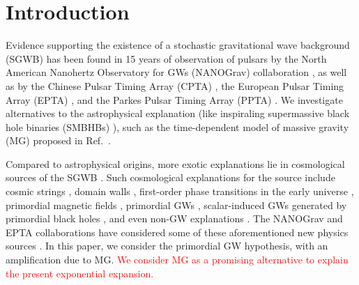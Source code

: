 \documentclass[prd,twocolumn,aps,psfig,nofootinbib,nobibnotes,superscriptaddress,preprintnumbers,times]{revtex4-2}
\def\red{\textcolor{red}}
\begin{document}
\maketitle
\section{Introduction}
Evidence supporting the existence of a stochastic gravitational wave background (SGWB) has been found in 15 years of observation of pulsars by the North American Nanohertz Observatory for GWs (NANOGrav) collaboration \cite{Agazie:2023}, as well as by the Chinese Pulsar Timing Array (CPTA) \cite{Xu:2023wog}, the European Pulsar Timing Array (EPTA) \cite{EPTA:2023sfo, EPTA:2023akd, EPTA:2023fyk}, and the Parkes Pulsar Timing Array (PPTA) \cite{Zic:2023gta,Reardon:2023gzh}. We investigate alternatives to the astrophysical explanation (like inspiraling supermassive black hole binaries (SMBHBs) \cite{Rajagopal:1995,Jaffe:2002rt,Burke-Spolaor:2018bvk}), such as the time-dependent model of massive gravity (MG) proposed in Ref.\ \cite{Fujita:2018ehq}. 

Compared to astrophysical origins, more exotic explanations lie in cosmological sources of the SGWB  \cite{Maggiore:1999vm, Caprini:2018mtu, Chen:2021wdo, Wu:2021kmd, Chen:2021ncc, PPTA:2022eul, Wu:2023pbt, Wu:2023dnp, Madge:2023cak, Ellis:2023oxs, Bian:2023dnv, Figueroa:2023zhu}. Such cosmological explanations for the source include  cosmic strings \cite{Damour:2004kw,Siemens:2006yp, Chen:2022azo,Bian:2022tju, Antusch:2024nqg}, domain walls \cite{Ferreira:2022zzo, Zhang:2023nrs, Gouttenoire:2023ftk}, first-order phase transitions in the early universe \cite{Kibble:1976sj, Vilenkin:1984ib,Caprini:2010xv, Kobakhidze:2017mru, Arunasalam:2017ajm, Xue:2021gyq, NANOGrav:2021flc, Moore:2021ibq, Addazi:2023jvg, Athron:2023xlk, Bringmann:2023opz, Ashoorioon:2022raz, Gouttenoire:2023bqy}, primordial magnetic fields \cite{Neronov:2020qrl,Brandenburg:2021tmp,RoperPol:2022iel,Kahniashvili:2021gym}, primordial GWs \cite{Grishchuk:1976, Grishchuk:1977zz, Starobinsky:1980te, Linde:1981mu, Fabbri:1983us, Grishchuk:2005qe, Lasky:2015lej, Kawai:2023nqs, Basilakos:2023xof, Basilakos:2023jvp, Benetti:2021uea, Vagnozzi:2020gtf}, scalar-induced GWs \cite{Tomita:1967non, Saito:2008jc, Young:2014ana, Yuan:2019udt, Yuan:2019wwo, Chen:2019xse, Cai:2019bmk, Yuan:2019fwv, Liu:2021jnw, Liu:2023ymk, Cai:2023dls, Choudhury:2023fjs, Choudhury:2023fwk, Bhattacharya:2023ysp, Choudhury:2023hfm, Kawai:2021edk, Pi:2021dft, Domenech:2020ers, Wang:2023sij} generated by primordial black holes \cite{Zeldovich:1967lct,Hawking:1971ei,Carr:1974nx,Chen:2018czv,Chen:2018rzo,Liu:2018ess,Liu:2019rnx,Chen:2019irf,Liu:2020cds,Wu:2020drm,Chen:2021nxo,Chen:2022fda,Chen:2022qvg,Liu:2022iuf,Zheng:2022wqo, Choudhury:2013woa, Franciolini:2023pbf, Wang:2023ost}, and even non-GW explanations \cite{Chowdhury:2023xvy}. The NANOGrav and EPTA collaborations have considered some of these aforementioned new physics sources \cite{Afzal:2023,EPTA:2023xxk}.
In this paper, we consider the primordial GW hypothesis, with an amplification due to MG. \red{We consider MG as a promising alternative to explain the present exponential expansion. }
\end{document}
